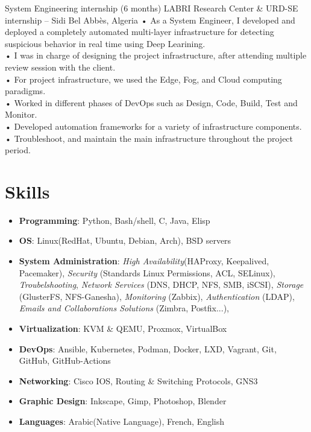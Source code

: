 \documentclass{cv}
\begin{document}
    {System Engineering internship (6 months)
    }
    {LABRI Research Center  \& URD-SE internship -- Sidi Bel Abbès, Algeria\vspace{.3cm}}
    {
      • As a System Engineer, I developed and deployed a completely automated multi-layer infrastructure 
      for detecting suspicious behavior in real time using Deep Learining.\\
      • I was in charge of designing the project infrastructure, after attending multiple review session 
      with the client.\\
      • For project infrastructure, we used the Edge, Fog, and Cloud computing paradigms.\\
      • Worked in different phases of DevOps such as Design, Code, Build, Test and Monitor.\\
      • Developed automation frameworks for a variety of infrastructure components.\\
      • Troubleshoot, and maintain the main infrastructure throughout the project period.\\
    }

\section{Skills}

\begin{itemize}
  \item{\bf{Programming}}: Python, Bash/shell, C, Java, Elisp 
  \item{\bf{OS}}: Linux(RedHat, Ubuntu, Debian, Arch), BSD servers
  \item{\bf{System Administration}}: 
    \emph{High Availability}(HAProxy, Keepalived, Pacemaker),
    \emph{Security} (Standards Linux Permissions, ACL, SELinux),
    \emph{Troubelshooting},
    \emph{Network Services} (DNS, DHCP, NFS, SMB, iSCSI),
    \emph{Storage} (GlusterFS, NFS-Ganesha),
    \emph{Monitoring} (Zabbix),
    \emph{Authentication} (LDAP),
    \emph{Emails and Collaborations Solutions} (Zimbra, Postfix...),

  \item{\bf{Virtualization}}: KVM \& QEMU, Proxmox, VirtualBox
  \item{\bf{DevOps}}: Ansible, Kubernetes, Podman, Docker, LXD, Vagrant, Git, GitHub, GitHub-Actions
  \item{\bf{Networking}}: Cisco IOS, Routing \& Switching Protocols, GNS3
  \item{\bf{Graphic Design}}: Inkscape, Gimp, Photoshop, Blender
  \item{\bf{Languages}}: Arabic(Native Language), French, English

\end{itemize}
\end{document}
